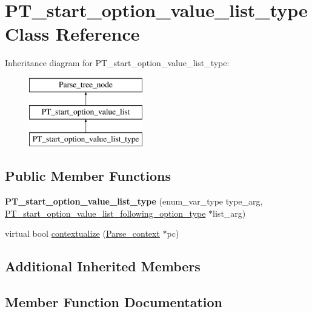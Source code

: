 \hypertarget{classPT__start__option__value__list__type}{}\section{P\+T\+\_\+start\+\_\+option\+\_\+value\+\_\+list\+\_\+type Class Reference}
\label{classPT__start__option__value__list__type}
Inheritance diagram for P\+T\+\_\+start\+\_\+option\+\_\+value\+\_\+list\+\_\+type\+:\begin{figure}[H]
\begin{center}
\leavevmode
\includegraphics[height=3.000000cm]{classPT__start__option__value__list__type}
\end{center}
\end{figure}
\subsection*{Public Member Functions}
\begin{DoxyCompactItemize}
\item 
\mbox{\label{classPT__start__option__value__list__type_a9c3ec6dd8ed6bc9f4b5c9a3f27d020e9}} 
{\bfseries P\+T\+\_\+start\+\_\+option\+\_\+value\+\_\+list\+\_\+type} (enum\+\_\+var\+\_\+type type\+\_\+arg, \mbox{\hyperlink{classPT__start__option__value__list__following__option__type}{P\+T\+\_\+start\+\_\+option\+\_\+value\+\_\+list\+\_\+following\+\_\+option\+\_\+type}} $\ast$list\+\_\+arg)
\item 
virtual bool \mbox{\hyperlink{classPT__start__option__value__list__type_abc8d6e7b1c8a8ccac6006ff6b6df3f49}{contextualize}} (\mbox{\hyperlink{structParse__context}{Parse\+\_\+context}} $\ast$pc)
\end{DoxyCompactItemize}
\subsection*{Additional Inherited Members}


\subsection{Member Function Documentation}
\mbox{\label{classPT__start__option__value__list__type_abc8d6e7b1c8a8ccac6006ff6b6df3f49}} 
